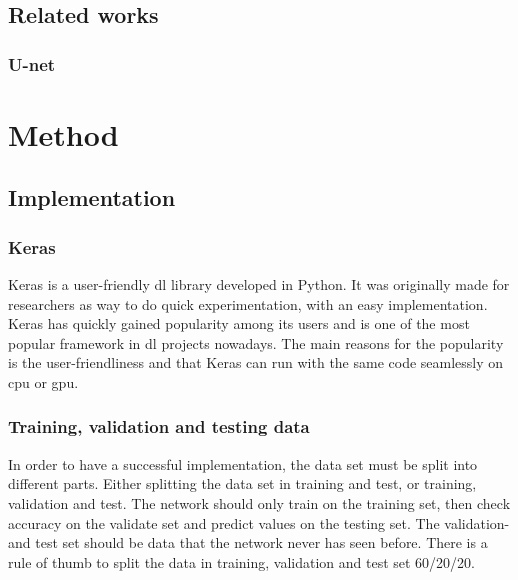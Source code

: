 \documentclass[USenglish]{ifimaster}  %
\begin{document}
\section{Related works}
\subsection{U-net}
\newpage
\chapter{Method}
\section{Implementation}
\subsection{Keras}
Keras is a user-friendly \ac{dl} library developed in Python. It was originally made for researchers as way to do quick experimentation, with an easy implementation. Keras has quickly gained popularity among its users and is one of the most popular framework in \ac{dl} projects nowadays. The main reasons for the popularity is the user-friendliness and that Keras can run with the same code seamlessly on \ac{cpu} or \ac{gpu}\cite{Francois_Deep_learning_with_python}.
\subsection{Training, validation and testing data}
In order to have a successful implementation, the data set must be split into different parts. Either splitting the data set in training and test, or training, validation and test. The network should only train on the training set, then check accuracy on the validate set and predict values on the testing set. The validation- and test set should be data that the network never has seen before. There is a rule of thumb to split the data in training, validation and test set 60/20/20.  
\end{document}
